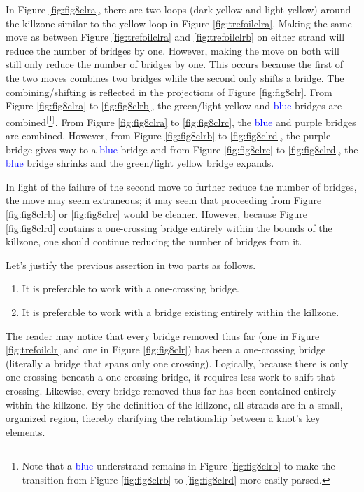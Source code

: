 \documentclass[titlepage,11pt]{article}
\begin{document}
In Figure \ref{fig:fig8clra}, there are two loops (\textcolor{yly}{dark yellow} and \textcolor{ylz}{light yellow}) around the killzone similar to the \textcolor{ylx}{yellow} loop in Figure \ref{fig:trefoilclra}. Making the same move as between Figure \ref{fig:trefoilclra} and \ref{fig:trefoilclrb} on either strand will reduce the number of bridges by one. However, making the move on both will still only reduce the number of bridges by one. This occurs because the first of the two moves combines two bridges while the second only shifts a bridge. The combining/shifting is reflected in the projections of Figure \ref{fig:fig8clr}. From Figure \ref{fig:fig8clra} to \ref{fig:fig8clrb}, the \textcolor{grx}{green}/\textcolor{ylz}{light yellow} and \textcolor{blue}{blue} bridges are combined$^[$\footnote{Note that a \textcolor{blue}{blue} understrand remains in Figure \ref{fig:fig8clrb} to make the transition from Figure \ref{fig:fig8clrb} to \ref{fig:fig8clrd} more easily parsed.}$^]$. From Figure \ref{fig:fig8clra} to \ref{fig:fig8clrc}, the \textcolor{blue}{blue} and \textcolor{pux}{purple} bridges are combined. However, from Figure \ref{fig:fig8clrb} to \ref{fig:fig8clrd}, the \textcolor{pux}{purple} bridge gives way to a \textcolor{blue}{blue} bridge and from Figure \ref{fig:fig8clrc} to \ref{fig:fig8clrd}, the \textcolor{blue}{blue} bridge shrinks and the \textcolor{grx}{green}/\textcolor{ylz}{light yellow} bridge expands.\par
In light of the failure of the second move to further reduce the number of bridges, the move may seem extraneous; it may seem that proceeding from Figure \ref{fig:fig8clrb} or \ref{fig:fig8clrc} would be cleaner. However, because Figure \ref{fig:fig8clrd} contains a one-crossing bridge entirely within the bounds of the killzone, one should continue reducing the number of bridges from it.\par
Let's justify the previous assertion in two parts as follows.

\begin{conj}
    \begin{enumerate}
        \item It is preferable to work with a one-crossing bridge.
        \item It is preferable to work with a bridge existing entirely within the killzone.
    \end{enumerate}
\end{conj}

The reader may notice that every bridge removed thus far (one in Figure \ref{fig:trefoilclr} and one in Figure \ref{fig:fig8clr}) has been a one-crossing bridge (literally a bridge that spans only one crossing). Logically, because there is only one crossing beneath a one-crossing bridge, it requires less work to shift that crossing. Likewise, every bridge removed thus far has been contained entirely within the killzone. By the definition of the killzone, all strands are in a small, organized region, thereby clarifying the relationship between a knot's key elements.
\end{document}
